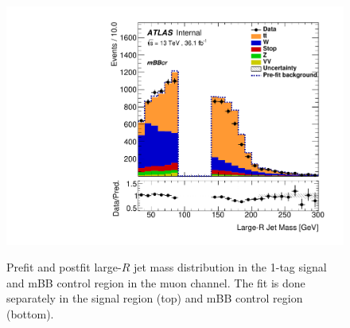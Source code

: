 \begin{figure}[!htbp]
\begin{center}
\includegraphics[scale=0.33]{./figures/boosted/ABCD_1tag0bjet/QCDFloat_1tag_mBBcrFit_mBBcr_Mu_Postfit}\\
\caption{Prefit and postfit large-$R$ jet mass distribution in the 1-tag signal and mBB control region in the muon channel. The fit is done separately
in the signal region (top) and mBB control region (bottom).}
\label{fig:boostedabcd_mbbcrSRsepa_muon_fit}
\end{center}
\end{figure}


